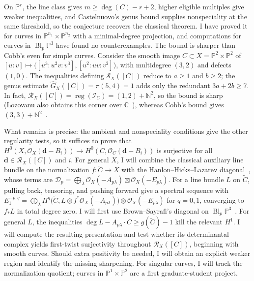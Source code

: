 \documentclass[11pt,reqno]{amsart}
\theoremstyle{remark}
\newcommand{\reg}{\operatorname{reg}}
\newcommand{\Bl}{\operatorname{Bl}}
\newcommand{\dd}{\mathbf{d}}
\newcommand{\CC}{\mathbb{C}}
\newcommand{\NN}{\mathbb{N}}
\newcommand{\PP}{\mathbb{P}}
\newcommand{\cD}{\mathcal{D}}
\newcommand{\cI}{\mathcal{I}}
\newcommand{\cO}{\mathcal{O}}
\newcommand{\cR}{\mathcal{R}}
\newcommand{\cS}{\mathcal{S}}
\begin{document}
On $\PP^r$, the line class gives $m\geq\deg(C)-r+2$, higher eligible multiples give weaker inequalities, and Castelnuovo's genus bound supplies nonspeciality at the same threshold, so the conjecture recovers the classical theorem. I have proved it for curves in $\PP^{n_1}\times\PP^{n_2}$ with a minimal-degree projection, and computations for curves in $\Bl_p\PP^3$ have found no counterexamples. The bound is sharper than Cobb's even for  simple curves. Consider the smooth image $C\subset X=\PP^2\times\PP^2$ of $[u:v]\mapsto\bigl([u^3:u^2v:v^3],[u^2:uv:v^2]\bigr)$, with multidegree $(3,2)$ and defects $(1,0)$. The inequalities defining $\cS_X([C])$ reduce to $a\geq1$ and $b\geq2$; the genus estimate $\widehat G_X([C])=\pi(5,4)=1$ adds only the redundant $3a+2b\geq7$. In fact, $\cR_X([C])=\reg(\cI_C)=(1,2)+\NN^2$, so the bound is sharp (Lozovanu also obtains this corner over $\CC$~\cite[Thm.~A]{lozovanu09}), whereas Cobb's bound gives $(3,3)+\NN^2$~\cite[Prop.~B]{cobb24}.
 
 What remains is precise: the ambient and nonspeciality conditions give the other regularity tests, so it suffices to prove that $H^0(X,\cO_X(\dd-B_i))\to H^0(C,\cO_C(\dd-B_i))$ is surjective for all $\dd\in\cR_X([C])$ and $i$. For general $X$, I will combine the classical auxiliary line bundle on the normalization $f\colon\widetilde C\to X$ with the Hanlon--Hicks--Lazarev diagonal~\cite{GLP83,cobb24,HHL24}, whose terms are $\cD_p=\bigoplus_\lambda\cO_X(-A_{p\lambda})\boxtimes\cO_X(-E_{p\lambda})$. For a line
bundle $L$ on $\widetilde C$, pulling back, tensoring, and
pushing forward give a spectral sequence with
$E_1^{-p,q}=\bigoplus_\lambda
H^q\!\bigl(\widetilde C,L\otimes f^*\cO_X(-A_{p\lambda})\bigr)
\otimes\cO_X(-E_{p\lambda})$ for $q=0,1$,
converging to $f_*L$ in total degree zero. I will first use Brown--Sayrafi's diagonal on $\Bl_p\PP^3$~\cite{brownSayrafi24}. For general $L$, the inequalities $\deg L-A_{p\lambda}\cdot C\ge g(\widetilde C)-1$ kill the relevant $H^1$. I will compute the resulting presentation and test whether its determinantal complex yields first-twist surjectivity throughout $\cR_X([C])$, beginning with smooth curves. Should extra positivity be needed, I will obtain an explicit weaker region and identify the missing sharpening. For singular curves, I will track the normalization quotient; curves in $\PP^1\times\PP^2$ are a first graduate-student project.
\end{document}
